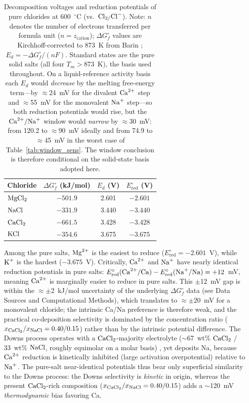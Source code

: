 \documentclass[pdflatex,sn-basic,Numbered]{sn-jnl}
\begin{document}
\begin{table}[!ht]
\centering
\footnotesize
\caption{Decomposition voltages and reduction potentials of pure chlorides at 600~$^{\circ}$C (vs.\ $\ce{Cl2/Cl-}$). Note: $n$ denotes the number of electrons transferred per formula unit ($n = z_{\mathrm{cation}}$); $\Delta G^{\circ}_f$ values are Kirchhoff-corrected to 873~K from Barin \cite{barin1995}; $E_d = -\Delta G^{\circ}_f/(nF)$. Standard states are the pure solid salts (all four $T_m > 873$~K), the basis used throughout. On a liquid-reference activity basis each $E_d$ would \emph{decrease} by the melting free-energy term---by $\approx$24~mV for the divalent $\ce{Ca^{2+}}$ step and $\approx$55~mV for the monovalent $\ce{Na+}$ step---so both reduction potentials would rise, but the $\ce{Ca^{2+}/Na+}$ window would \emph{narrow} by $\approx$30~mV: from 120.2 to $\approx$90~mV ideally and from 74.9 to $\approx$45~mV in the worst case of Table~\ref{tab:window_sens}. The window conclusion is therefore conditional on the solid-state basis adopted here.}
\label{tab:Ed}
\begin{tabular}{lccc}
\toprule
Chloride & $\Delta G^{\circ}_f$ (kJ/mol) & $E_d$ (V) & $E^{\circ}_{\mathrm{red}}$ (V) \\
\midrule
$\ce{MgCl2}$ & $-501.9$ & 2.601 & $-2.601$ \\
$\ce{NaCl}$  & $-331.9$ & 3.440 & $-3.440$ \\
$\ce{CaCl2}$ & $-661.5$ & 3.428 & $-3.428$ \\
$\ce{KCl}$   & $-354.6$ & 3.675 & $-3.675$ \\
\bottomrule
\end{tabular}
\end{table}

Among the pure salts, $\ce{Mg^{2+}}$ is the easiest to reduce ($E^{\circ}_{\mathrm{red}} = -2.601$~V), while $\ce{K+}$ is the hardest ($-3.675$~V). Critically, $\ce{Ca^{2+}}$ and $\ce{Na+}$ have nearly identical reduction potentials in pure salts: $E^{\circ}_{\mathrm{red}}(\ce{Ca^{2+}/Ca}) - E^{\circ}_{\mathrm{red}}(\ce{Na+/Na}) = +12$~mV, meaning $\ce{Ca^{2+}}$ is marginally easier to reduce in pure salts. This $\pm$12~mV gap is within the $\approx\pm$2~kJ/mol uncertainty of the underlying $\Delta G^{\circ}_f$ data (see Data Sources and Computational Methods), which translates to $\approx\pm$20~mV for a monovalent chloride; the intrinsic Ca/Na preference is therefore weak, and the practical co-deposition selectivity is dominated by the concentration ratio ($x_{\ce{CaCl2}}/x_{\ce{NaCl}} = 0.40/0.15$) rather than by the intrinsic potential difference. The Downs process operates with a $\ce{CaCl2}$-majority electrolyte ($\sim$67~wt\% $\ce{CaCl2}$ / 33~wt\% $\ce{NaCl}$, roughly equimolar on a molar basis) \cite{pletcher1990}, yet deposits Na, because $\ce{Ca^{2+}}$ reduction is kinetically inhibited (large activation overpotential) relative to $\ce{Na+}$. The pure-salt near-identical potentials thus bear only superficial similarity to the Downs process: the Downs selectivity is \emph{kinetic} in origin, whereas the present $\ce{CaCl2}$-rich composition ($x_{\ce{CaCl2}}/x_{\ce{NaCl}} = 0.40/0.15$) adds a $\sim$120~mV \emph{thermodynamic} bias favoring Ca.
\end{document}
